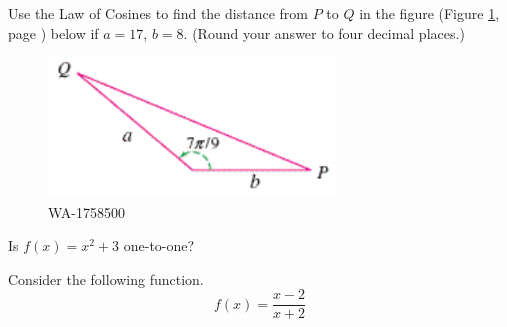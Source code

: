 \documentclass[12pt,addpoints, answers, fleqn]{exam}
\begin{document}
\begin{teacher}
\begin{questions}
\question 	%

Use the Law of Cosines to find the distance from $P$ to $Q$ in the figure (Figure \ref{fig:1758500}, page \pageref{fig:1758500}) below if $a = 17$, $b = 8$. (Round your answer to four decimal places.)
 
 \begin{figure}[htbp] %
    \centering
    \includegraphics[width=3in]{./graphics/1758500.pdf} 
    \caption{WA-1758500}
    \label{fig:1758500}
 \end{figure}
\begin{solution}
\end{solution}

\question 	%

Is $f\left(x\right) = x^2 + 3$ one-to-one?
 
\begin{solution}
\end{solution}

\question 	%

Consider the following function.
\[
f\left(x\right) = \frac{x-2}{x+2}
\]
\end{questions}
\end{teacher}
\end{document}
